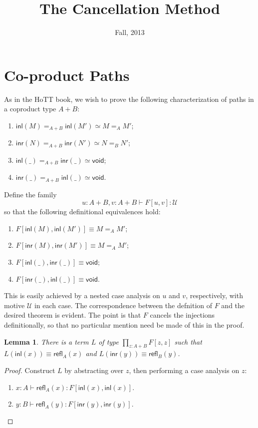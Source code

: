 \documentclass{article}
\title{The Cancellation Method}
\date{Fall, 2013}
\newcommand{\zeroty}{\mathsf{void}}
\newcommand{\sumty}[2]{{#1}+{#2}}
\newcommand{\inleft}[1]{\mathsf{inl}(#1)}
\newcommand{\inright}[1]{\mathsf{inr}{(#1)}}
\newcommand{\idty}[3]{{#2}\mathbin{=_{#1}}{#3}}
\newcommand{\refl}[2]{\mathsf{refl}_{#1}({#2})}
\newcommand{\prodty}[3]{\prod_{{#1}{:}{#2}}{#3}}
\newcommand{\app}[2]{{#1}({#2})}
\newcommand{\univty}{\mathcal{U}}
\newtheorem{lemma}[theorem]{Lemma}
\begin{document}
\section{Co-product Paths}

As in the HoTT book, we wish to prove the following characterization of paths in a coproduct type $A+B$:
\begin{enumerate}
\item $\idty{\sumty{A}{B}}{\inleft{M}}{\inleft{M'}} \simeq \idty{A}{M}{M'}$;
\item $\idty{\sumty{A}{B}}{\inright{N}}{\inright{N'}} \simeq \idty{B}{N}{N'}$;
\item $\idty{\sumty{A}{B}}{\inleft{\_}}{\inright{\_}} \simeq \zeroty$;
\item $\idty{\sumty{A}{B}}{\inright{\_}}{\inleft{\_}} \simeq \zeroty$.
\end{enumerate}

Define the family $$u:\sumty{A}{B},v:\sumty{A}{B}\vdash F[u,v]:\univty$$ so that the following definitional equivalences hold:
\begin{enumerate}
\item $F[\inleft{M},\inleft{M'}]\equiv \idty{A}{M}{M'}$;
\item $F[\inright{M},\inright{M'}]\equiv \idty{A}{M}{M'}$;
\item $F[\inleft{\_},\inright{\_}]\equiv\zeroty$;
\item $F[\inright{\_},\inleft{\_}]\equiv\zeroty$.
\end{enumerate}
This is easily achieved by a nested case analysis on $u$ and $v$, respectively, with motive $\univty$ in each case.  The correspondence between the defnition of $F$ and the desired theorem is evident.  The point is that $F$ cancels the injections definitionally, so that no particular mention need be made of this in the proof.

\begin{lemma}
  \label{L-lemma}
  There is a term $L$ of type $\prodty{z}{\sumty{A}{B}}{F[z,z]}$ such that $\app{L}{\inleft{x}}\equiv \refl{A}{x}$ and $\app{L}{\inright{y}}\equiv \refl{B}{y}$.
\end{lemma}
\begin{proof}
  Construct $L$ by abstracting over $z$, then performing a case analysis on $z$:
  \begin{enumerate}
  \item $x:A\vdash \refl{A}{x}:F[\inleft{x},\inleft{x}]$.
  \item $y:B\vdash \refl{A}{y}:F[\inright{y},\inright{y}]$.
  \end{enumerate}
\end{proof}
\end{document}
